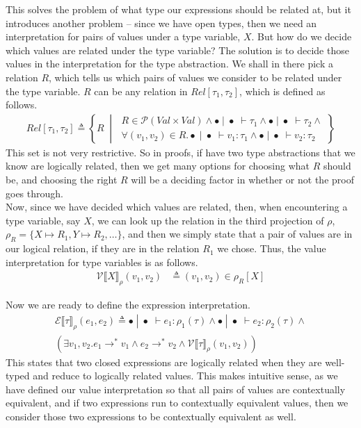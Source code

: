 \documentclass[twoside,11pt,openright]{report}
\theoremstyle{definition}
\newcommand{\expr}{e}
\newcommand{\val}{v}
\newcommand{\Tvar}{X}
\newcommand{\TvarB}{Y}
\newcommand{\typ}{\tau}
\newcommand{\emptenv}{\bullet}
\newcommand{\empvenv}{\bullet}
\newcommand{\jdg}[4]{#1 \; | \; #2 \; \vdash #3 : #4}
\newcommand{\jdgType}[3]{#1 \; | \; #2 \; \vdash #3}
\newcommand{\stepS}{\rightarrow^*}
\newcommand{\ValInp}[2]{\mathcal{V} \llbracket #1 \rrbracket_{#2}}
\newcommand{\ValInpGen}[2]{\ValInp{#1}{#2}(\val_1, \val_2)}
\newcommand{\ExpInp}[2]{\mathcal{E} \llbracket #1 \rrbracket_{#2}}
\begin{document}
This solves the problem of what type our expressions should be related at, but it introduces another problem – since we have open types, then we need an interpretation for pairs of values under a type variable, $\Tvar$. But how do we decide which values are related under the type variable? The solution is to decide those values in the interpretation for the type abstraction. We shall in there pick a relation $R$, which tells us which pairs of values we consider to be related under the type variable. $R$ can be any relation in $Rel[\typ_1, \typ_2]$, which is defined as follows.
\begin{align*}
  Rel[\typ_1, \typ_2] \triangleq 
  \left\{R \; \middle\vert \;
  \begin{aligned}
    R \in \mathcal{P}(Val \times Val) \land \jdgType{\emptenv}{\empvenv}{\typ_1} \land \jdgType{\emptenv}{\empvenv}{\typ_2} \land\\ \forall (\val_1, \val_2) \in R . \jdg{\emptenv}{\empvenv}{\val_1}{\typ_1} \land \jdg{\emptenv}{\empvenv}{\val_2}{\typ_2}
  \end{aligned}
  \right\}
\end{align*}
This set is not very restrictive. So in proofs, if have two type abstractions that we know are logically related, then we get many options for choosing what $R$ should be, and choosing the right $R$ will be a deciding factor in whether or not the proof goes through.\\
Now, since we have decided which values are related, then, when encountering a type variable, say $\Tvar$, we can look up the relation in the third projection of $\rho$, $\rho_R = \{\Tvar \mapsto R_1, \TvarB \mapsto R_2, \dots\}$, and then we simply state that a pair of values are in our logical relation, if they are in the relation $R_1$ we chose. Thus, the value interpretation for type variables is as follows.
\begin{align*}
  \ValInpGen{\Tvar}{\rho} &\triangleq (\val_1, \val_2) \in \rho_R[\Tvar]
\end{align*}

Now we are ready to define the expression interpretation.
\begin{multline*}
  \ExpInp{\typ}{\rho}(\expr_1, \expr_2) \triangleq
    \jdg{\emptenv}{\empvenv}{\expr_1}{\rho_1(\typ)} \land \jdg{\emptenv}{\empvenv}{\expr_2}{\rho_2(\typ)} \land\\
    (\exists \val_1, \val_2 . \expr_1 \stepS \val_1 \land \expr_2 \stepS \val_2 \land\ValInpGen{\typ}{\rho})
\end{multline*}
This states that two closed expressions are logically related when they are well-typed and reduce to logically related values. This makes intuitive sense, as we have defined our value interpretation so that all pairs of values are contextually equivalent, and if two expressions run to contextually equivalent values, then we consider those two expressions to be contextually equivalent as well.
\end{document}
